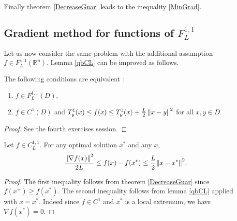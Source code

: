 Finally theorem \ref{DecreaseGuar} leads to the inequality \eqref{MinGrad}.

\subsection{Gradient method for functions of $F_L^{1,1}$}

Let us now consider the same problem with the additional assumption $f \in F_L^{1,1}(\mathbb{R}^n)$. Lemma \ref{qbCL} can be improved as follows.

\begin{lemma}
The following conditions are equivalent :
\begin{enumerate}%
\item $f \in F_L^{1,1}(D)$,
\item $f \in C^1(D)$ and $T_y^1(x) \le f(x) \le  T_y^1(x) + \frac{L}{2}\left\Vert x-y \right\Vert^2$ for all $x,y \in D$.
\end{enumerate}
\label{qbFL}
\end{lemma}
\begin{proof}
See the fourth exercises session.
\end{proof}

\begin{lemma}
Let $f \in C_L^{1,1}$. For any optimal solution $x^*$ and any $x$,
\begin{equation*}
\frac{{\left\Vert \nabla f(x) \right\Vert}^2}{2L} \le f(x) - f(x^*) \le \frac{L}{2} {\left\Vert x-x^* \right\Vert}^2 .
\end{equation*}
\end{lemma}
\begin{proof}
The first inequality follows from theorem \ref{DecreaseGuar} since $f(x^+) \ge f(x^*)$. The second inequality follows from lemma \ref{qbCL} applied with $x = x^*$. Indeed since $f \in C^1$ and $x^*$ is a local extremum, we have $\nabla f(x^*) = 0$.
\end{proof}

